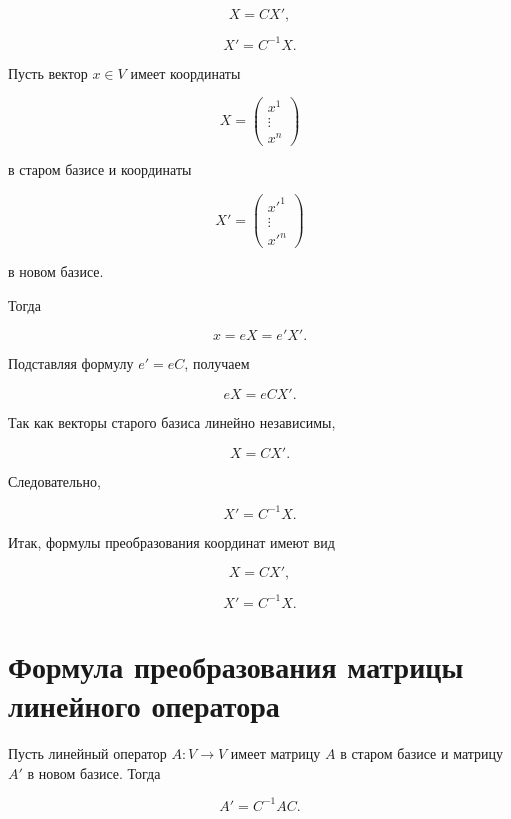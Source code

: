 \documentclass[14pt]{extreport}
\begin{document}
    \begin{thbox}
        \[
X=CX',
\]

\[
X'=C^{-1}X.
\]
    \end{thbox}
    \begin{prbox}
        Пусть вектор \(x\in V\) имеет координаты

\[
X=
\begin{pmatrix}
x^1\\
\vdots\\
x^n
\end{pmatrix}
\]

в старом базисе и координаты

\[
X'=
\begin{pmatrix}
{x'}^1\\
\vdots\\
{x'}^n
\end{pmatrix}
\]

в новом базисе.

Тогда

\[
x=eX=e'X'.
\]

Подставляя формулу \(e'=eC\), получаем

\[
eX=eCX'.
\]

Так как векторы старого базиса линейно независимы,

\[
X=CX'.
\]

Следовательно,

\[
X'=C^{-1}X.
\]

Итак, формулы преобразования координат имеют вид

\[
X=CX',
\]

\[
X'=C^{-1}X.
\]

    \end{prbox}

    \section{Формула преобразования матрицы линейного оператора}
    \begin{thbox}
        Пусть линейный оператор \(A:V\to V\) имеет матрицу \(A\) в старом базисе и матрицу \(A'\) в новом базисе. Тогда

\[
A'=C^{-1}AC.
\]

    \end{thbox}
\end{document}
